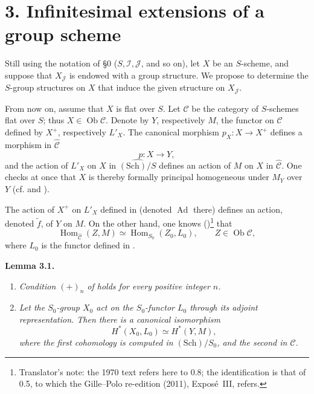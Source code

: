 

\section*{3. Infinitesimal extensions of a group scheme}

Still using the notation of \S0 (\(S,\mathscr I,\mathscr J\), and so on),
let \(X\) be an \(S\)-scheme, and suppose that \(X_{\mathscr J}\) is
endowed with a group structure. We propose to determine the \(S\)-group
structures on \(X\) that induce the given structure on
\(X_{\mathscr J}\).

From now on, assume that \(X\) is flat over \(S\). Let \(\mathscr C\) be
the category of \(S\)-schemes flat over \(S\); thus
\(X\in\operatorname{Ob}\mathscr C\). Denote by \(Y\), respectively \(M\),
the functor on \(\mathscr C\) defined by \(X^+\), respectively \(L'_X\).
The canonical morphism \(p_X:X\to X^+\) defines a morphism in
\(\widehat{\mathscr C}\)
\[
 p:X\longrightarrow Y,
\]
and the action of \(L'_X\) on \(X\) in
\(\widehat{(\mathrm{Sch})/S}\) defines an action of \(M\) on \(X\) in
\(\widehat{\mathscr C}\). One checks at once that \(X\) is thereby
formally principal homogeneous under \(M_Y\) over \(Y\) (cf. 
and ).

The action of \(X^+\) on \(L'_X\) defined in  (denoted
\(\operatorname{Ad}\) there) defines an action, denoted \(\widetilde f\),
of \(Y\) on \(M\). On the other hand, one knows
()\footnote{Translator's note: the 1970 text refers here to 0.8; the
identification is that of 0.5, to which the Gille--Polo re-edition (2011),
Exposé~III, refers.} that
\[
 \operatorname{Hom}_{\widehat{\mathscr C}}(Z,M)
 \simeq \operatorname{Hom}_{S_0}(Z_0,L_0),
 \qquad Z\in\operatorname{Ob}\mathscr C,
\]
where \(L_0\) is the functor defined in .

\medskip
\noindent{}\textbf{Lemma 3.1.}
\begin{enumerate}
\item[(i)] \textit{Condition \((+)_{n}\) of  holds for every positive
integer \(n\).}
\item[\SGAInlineRefTarget{sga3:iii:lemma:3-1:item:ii}(ii)] \textit{Let the \(S_0\)-group \(X_0\) act on the
\(S_0\)-functor \(L_0\) through its adjoint representation. Then there is
a canonical isomorphism}
\[
 H^*(X_0,L_0)\simeq H^*(Y,M),
\]
\textit{where the first cohomology is computed in
\((\mathrm{Sch})/S_0\), and the second in \(\mathscr C\).}
\end{enumerate}

